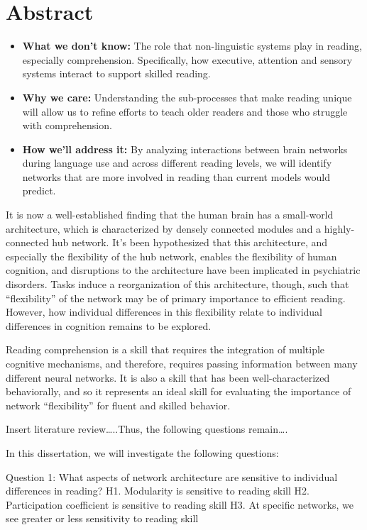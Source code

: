\chapter{Abstract}

\begin{itemize}
	\item \textbf{What we don't know:} The role that non-linguistic systems play in reading, especially comprehension. Specifically, how executive, attention and sensory systems interact to support skilled reading.
	\item \textbf{Why we care:} Understanding the sub-processes that make reading unique will allow us to refine efforts to teach older readers and those who struggle with comprehension.
	\item \textbf{How we'll address it:} By analyzing interactions between brain networks during language use and across different reading levels, we will identify networks that are more involved in reading than current models would predict. 
\end{itemize}


It is now a well-established finding that the human brain has a small-world architecture, which is characterized by densely connected modules and a highly-connected hub network. It’s been hypothesized that this architecture, and especially the flexibility of the hub network, enables the flexibility of human cognition, and disruptions to the architecture have been implicated in psychiatric disorders. Tasks induce a reorganization of this architecture, though, such that “flexibility” of the network may be of primary importance to efficient reading. However, how individual differences in this flexibility relate to individual differences in cognition remains to be explored.

Reading comprehension is a skill that requires the integration of multiple cognitive mechanisms, and therefore, requires passing information between many different neural networks. It is also a skill that has been well-characterized behaviorally, and so it represents an ideal skill for evaluating the importance of network “flexibility” for fluent and skilled behavior.

Insert literature review…..Thus, the following questions remain….

In this dissertation, we will investigate the following questions:


Question 1: What aspects of network architecture are sensitive to individual differences in reading?
H1. Modularity is sensitive to reading skill
H2. Participation coefficient is sensitive to reading skill
H3. At specific networks, we see greater or less sensitivity to reading skill

